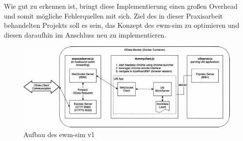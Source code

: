 Wie gut zu erkennen ist, bringt diese Implementierung einen großen Overhead und somit mögliche Fehlerquellen mit sich. Ziel des in dieser Praxisarbeit behandelten Projekts soll es sein, das Konzept des \ac{ewm-sim} zu optimieren und diesen daraufhin im Anschluss neu zu implementieren.

\begin{figure}
    \centering
    \includegraphics[width=\textwidth]{Bilder/ewm-sim_v1_4x.pdf}
    \caption{Aufbau des ewm-sim v1}
    \label{fig:ewm-sim-v1}
\end{figure}

